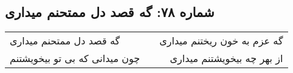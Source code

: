 \begin{center}
\section*{شماره ۷۸: گه قصد دل ممتحنم میداری}
\label{sec:078}
\begin{longtable}{l p{0.5cm} r}
گه قصد دل ممتحنم میداری
&&
گه عزم به خون ریختنم میداری
\\
چون میدانی که بی تو بیخویشتنم
&&
از بهر چه بیخویشتنم میداری
\\
\end{longtable}
\end{center}
